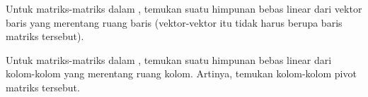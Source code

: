 \begin{exercise}
Untuk matriks-matriks dalam , temukan
suatu himpunan bebas linear dari vektor baris yang merentang ruang baris
(vektor-vektor itu tidak harus berupa baris matriks tersebut).
\end{exercise}

\begin{exercise}
Untuk matriks-matriks dalam , temukan
suatu himpunan bebas linear dari kolom-kolom yang merentang ruang kolom.
Artinya, temukan kolom-kolom pivot matriks tersebut.
\end{exercise}


